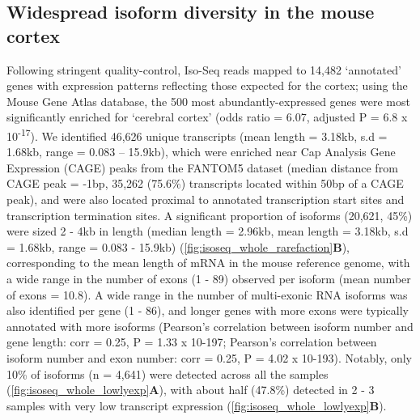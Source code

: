 \subsection{Widespread isoform diversity in the mouse cortex}
Following stringent quality-control, Iso-Seq reads mapped to 14,482 ‘annotated’ genes with expression patterns reflecting those expected for the cortex; using the Mouse Gene Atlas database, the 500 most abundantly-expressed genes were most significantly enriched for ‘cerebral cortex’ (odds ratio = 6.07, adjusted P = 6.8 x 10\textsuperscript{-17}). We identified 46,626 unique transcripts (mean length = 3.18kb, s.d = 1.68kb, range = 0.083 – 15.9kb), which were enriched near Cap Analysis Gene Expression (CAGE) peaks from the FANTOM5 dataset (median distance from CAGE peak = -1bp, 35,262 (75.6\%) transcripts located within 50bp of a CAGE peak), and were also located proximal to annotated transcription start sites and transcription termination sites. A significant proportion of isoforms (20,621, 45\%) were sized 2 - 4kb in length (median length = 2.96kb, mean length = 3.18kb, s.d = 1.68kb, range = 0.083 - 15.9kb) (\cref{fig:isoseq_whole_rarefaction}\textbf{B}), corresponding to the mean length of mRNA in the mouse reference genome, with a wide range in the number of exons (1 - 89) observed per isoform (mean number of exons = 10.8). A wide range in the number of multi-exonic RNA isoforms was also identified per gene (1 - 86), and longer genes with more exons were typically annotated with more isoforms (Pearson's correlation between isoform number and gene length: corr = 0.25, P = 1.33 x 10-197; Pearson's correlation between isoform number and exon number: corr = 0.25, P = 4.02 x 10-193). Notably, only 10\% of isoforms (n = 4,641) were detected across all the samples (\cref{fig:isoseq_whole_lowlyexp}\textbf{A}), with about half (47.8\%) detected in 2 - 3 samples with very low transcript expression (\cref{fig:isoseq_whole_lowlyexp}\textbf{B}). 

